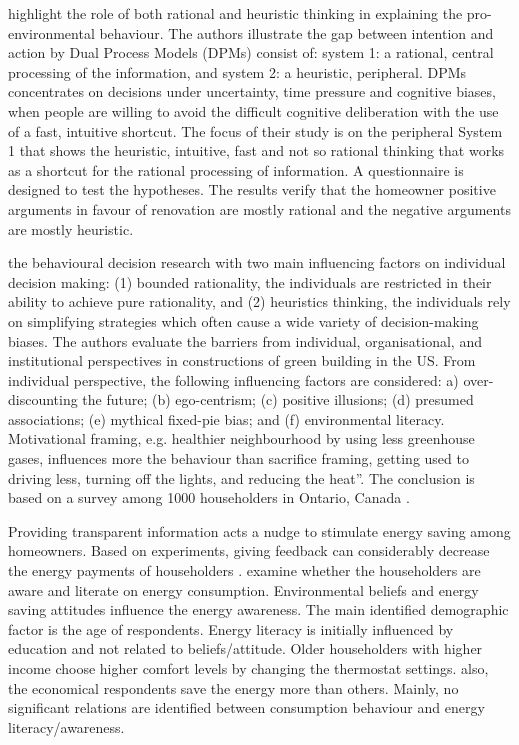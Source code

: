 \documentclass[preprint,12pt,3p]{elsarticle}
\begin{document}
\citeauthor{taranu2016} \citeyearpar{taranu2016}  highlight the role of both rational and heuristic thinking in explaining the pro-environmental behaviour. The authors illustrate the gap between intention and action by Dual Process Models (DPMs) consist of: system 1: a rational, central processing of the information, and system 2: a heuristic, peripheral. DPMs concentrates on decisions under uncertainty, time pressure and cognitive biases, when people are willing to avoid the difficult cognitive deliberation with the use of a fast, intuitive shortcut. The focus of their study is on the peripheral System 1 that shows the heuristic, intuitive, fast and not so rational thinking that works as a shortcut for the rational processing of information. A questionnaire is designed to test the hypotheses. The results verify that the homeowner positive arguments in favour of renovation are mostly rational and the negative arguments are mostly heuristic.


\citeauthor{hoffman2008} \citeyearpar{hoffman2008} the behavioural decision research with two main influencing factors on individual decision making: (1) bounded rationality, the individuals are restricted in their ability to achieve pure rationality, and (2) heuristics thinking, the individuals rely on simplifying strategies which often cause a wide variety of decision-making biases. The authors evaluate the barriers from individual, organisational, and institutional perspectives in constructions of green building in the US. From individual perspective, the following influencing factors are considered:  a) over-discounting the future; (b) ego-centrism; (c) positive illusions; (d) presumed associations; (e) mythical fixed-pie bias; and (f) environmental literacy. Motivational framing, e.g. healthier neighbourhood by using less greenhouse gases, influences more the behaviour than sacrifice framing, getting used to driving less, turning off the lights, and reducing the heat”. The conclusion is based on a survey among 1000 householders in Ontario, Canada \citep{gifford2011}. 

Providing transparent information acts a nudge to stimulate energy saving among homeowners. Based on experiments, giving feedback can considerably decrease the energy payments of householders \citep{ayres2013}. \citeauthor{brounen2013energy} \citeyearpar{brounen2013energy} examine whether the householders are aware and literate on energy consumption. Environmental beliefs and energy saving attitudes influence the energy awareness. The main identified demographic factor is the age of respondents. Energy literacy is initially influenced by education and not related to beliefs/attitude. Older householders with higher income choose higher comfort levels by changing the thermostat settings. also, the economical respondents save the energy more than others. Mainly, no significant relations are identified between consumption behaviour and energy literacy/awareness. 
\end{document}

